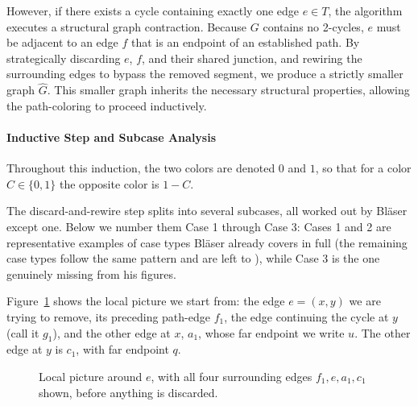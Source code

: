 However, if there exists a cycle containing exactly one edge $e \in T$, the
algorithm executes a structural graph contraction. Because $G$ contains no
2-cycles, $e$ must be adjacent to an edge $f$ that is an endpoint of an
established path. By strategically discarding $e$, $f$, and their shared
junction, and rewiring the surrounding edges to bypass the removed segment, we
produce a strictly smaller graph $\hat{G}$. This smaller graph inherits the
necessary structural properties, allowing the path-coloring to proceed
inductively.

\paragraph{Inductive Step and Subcase Analysis}
Throughout this induction, the two colors are denoted $0$ and $1$, so that for a
color $C \in \{0,1\}$ the opposite color is $1-C$.

The discard-and-rewire step splits into several subcases, all worked out by
Bl\"aser \cite{Blaser2004} except one. Below we number them Case 1 through Case
3: Cases 1 and 2 are representative examples of case types Bl\"aser already
covers in full (the remaining case types follow the same pattern and are left to
\cite{Blaser2004}), while Case 3 is the one genuinely missing from his figures.

Figure~\ref{fig:pc-full} shows the local picture we start from: the edge
$e=(x,y)$ we are trying to remove, its preceding path-edge $f_1$, the edge
continuing the cycle at $y$ (call it $g_1$), and the other edge at $x$, $a_1$,
whose far endpoint we write $u$. The other edge at $y$ is $c_1$, with far
endpoint $q$.

\begin{figure}[H]
\centering
{}
\caption{Local picture around $e$, with all four surrounding edges
$f_1,e,a_1,c_1$ shown, before anything is discarded.}
\label{fig:pc-full}
\end{figure}

